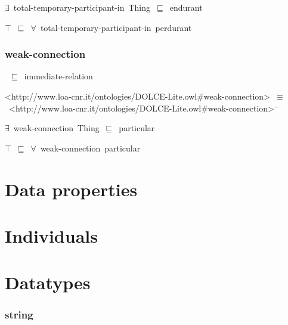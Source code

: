 \documentclass{article}
\begin{document}
\ensuremath{\exists}~total-temporary-participant-in~Thing~\ensuremath{\sqsubseteq}~endurant

\ensuremath{\top}~\ensuremath{\sqsubseteq}~\ensuremath{\forall}~total-temporary-participant-in~perdurant

\subsubsection*{weak-connection}

~\ensuremath{\sqsubseteq}~immediate-relation

<http://www.loa-cnr.it/ontologies/DOLCE-Lite.owl#weak-connection>~\ensuremath{\equiv}~<http://www.loa-cnr.it/ontologies/DOLCE-Lite.owl#weak-connection>\ensuremath{^-}

\ensuremath{\exists}~weak-connection~Thing~\ensuremath{\sqsubseteq}~particular

\ensuremath{\top}~\ensuremath{\sqsubseteq}~\ensuremath{\forall}~weak-connection~particular

\section*{Data properties}\section*{Individuals}\section*{Datatypes}\subsubsection*{string}
\end{document}
